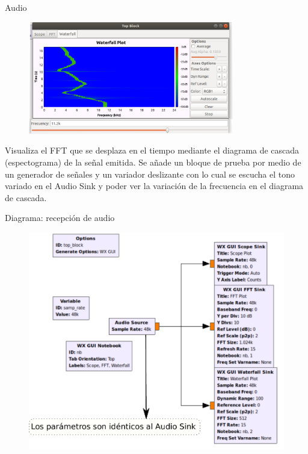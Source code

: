 \begin{frame}{Audio}

\begin{figure}

\begin{center}
\vspace{-6mm}
\includegraphics[width=0.8\textwidth]{parte1/lab3/pdf/lab3_6.pdf}
\end{center}
\end{figure}
\vspace{-3mm}
\tiny
Visualiza el FFT que se desplaza en el tiempo mediante el diagrama de cascada (espectograma) de la señal emitida. Se añade un bloque de prueba por medio de un generador de señales y un variador deslizante con lo cual se escucha el tono variado en el Audio Sink y poder ver la variación de la frecuencia en el diagrama de cascada.
\end{frame}

\begin{frame}{Diagrama: recepción de audio}

\begin{figure}

\begin{center}
\includegraphics[width=.73\textwidth]{parte1/lab3/pdf/lab3_7.pdf}
\end{center}
\end{figure}

\end{frame}

